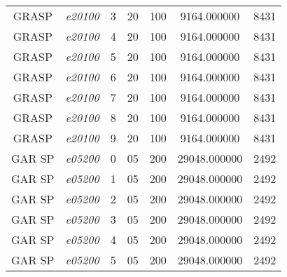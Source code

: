 {\begin{longtable}{cc|c|cc|cc}
			GRASP              & \textit{e20100}    & 3                               & 20               & 100              & 9164.000000                          & 8431 \\ 
			GRASP              & \textit{e20100}    & 4                               & 20               & 100              & 9164.000000                          & 8431 \\ 
			GRASP              & \textit{e20100}    & 5                               & 20               & 100              & 9164.000000                          & 8431 \\ 
			GRASP              & \textit{e20100}    & 6                               & 20               & 100              & 9164.000000                          & 8431 \\ 
			GRASP              & \textit{e20100}    & 7                               & 20               & 100              & 9164.000000                          & 8431 \\ 
			GRASP              & \textit{e20100}    & 8                               & 20               & 100              & 9164.000000                          & 8431 \\ 
			GRASP              & \textit{e20100}    & 9                               & 20               & 100              & 9164.000000                          & 8431 \\ \hline
			GAR SP             & \textit{e05200}    & 0                               & 05               & 200              & 29048.000000                          & 2492 \\ 
			GAR SP             & \textit{e05200}    & 1                               & 05               & 200              & 29048.000000                          & 2492 \\ 
			GAR SP             & \textit{e05200}    & 2                               & 05               & 200              & 29048.000000                          & 2492 \\ 
			GAR SP             & \textit{e05200}    & 3                               & 05               & 200              & 29048.000000                          & 2492 \\ 
			GAR SP             & \textit{e05200}    & 4                               & 05               & 200              & 29048.000000                          & 2492 \\ 
			GAR SP             & \textit{e05200}    & 5                               & 05               & 200              & 29048.000000                          & 2492 \\ 

\end{longtable}}
